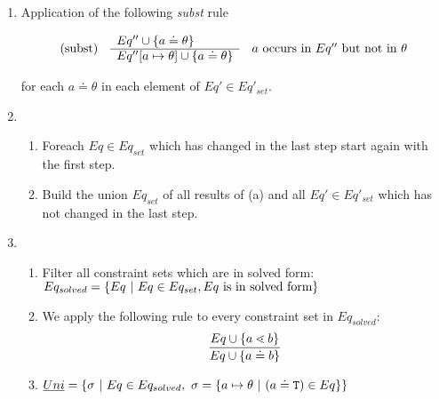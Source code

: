 \documentclass[runningheads]{llncs}
\begin{document}
\begin{enumerate}
\item \label{subst-step}  Application of the following \emph{subst} rule
    
      $$\begin{array}[c]{lll}
        (\mathrm{subst}) &
        \begin{array}[c]{l}
          Eq'' \cup \{ a \doteq \theta \}\\
          \hline
          Eq''[a \mapsto \theta] \cup \{ a \doteq \theta \}
        \end{array}
        & a \textrm{ occurs in } Eq'' \textrm{ but not in } \theta 
      \end{array}$$
      
      for each $a \doteq \theta$ in each element of $Eq' \in Eq'_{set}$.

\item 
    \begin{enumerate}
    \item Foreach $Eq \in Eq_{set}$ which has changed in the last step
      start again with the first step.
    \item Build the union $Eq_{set}$ of all results of (a) and all $Eq' \in
      Eq'_{set}$ which has not changed in the last step.
    \end{enumerate}
\item
\begin{enumerate}
\item Filter all constraint sets which are in solved form:\\
$Eq_{solved} = \{  Eq \ | \ Eq \in Eq_{set}, Eq \ \text{is in solved form} \}$
\item We apply the following rule to every constraint set in $Eq_{solved}$:
\begin{align*}
\ddfrac{
  Eq \cup \set{ a \lessdot b } %
}{
  Eq \cup \set{ a \doteq b }
}
\end{align*}
\item $\emph{Uni} = \{ \sigma \ | \ Eq \in Eq_{solved},\ \sigma = \{ a \mapsto \theta \ | \ (a \doteq \texttt{T}) \in Eq \}  \}$
\end{enumerate}
\end{enumerate}
\end{document}
